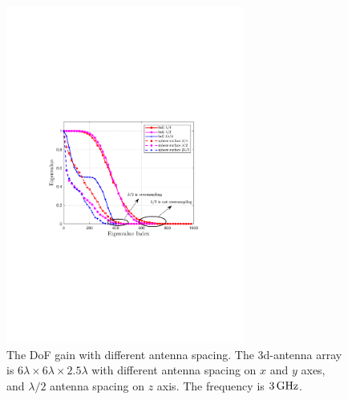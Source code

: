 \documentclass[12pt,draftclsnofoot,journal,onecolumn]{IEEEtran}
\begin{document}
\begin{figure}
	\centering 
	\includegraphics[width=0.7\textwidth]{figs/different_antenna_spacing_merge.pdf} 
	\caption{The DoF gain with different antenna spacing. The 3d-antenna array is $6\lambda \times 6\lambda \times 2.5\lambda$ with different antenna spacing on $x$ and $y$ axes, and $\lambda/2$ antenna spacing on $z$ axis. The frequency is $3\,{\rm GHz}$.} 
	\label{different_antenna_spacing_merge}
\end{figure}
\end{document}
